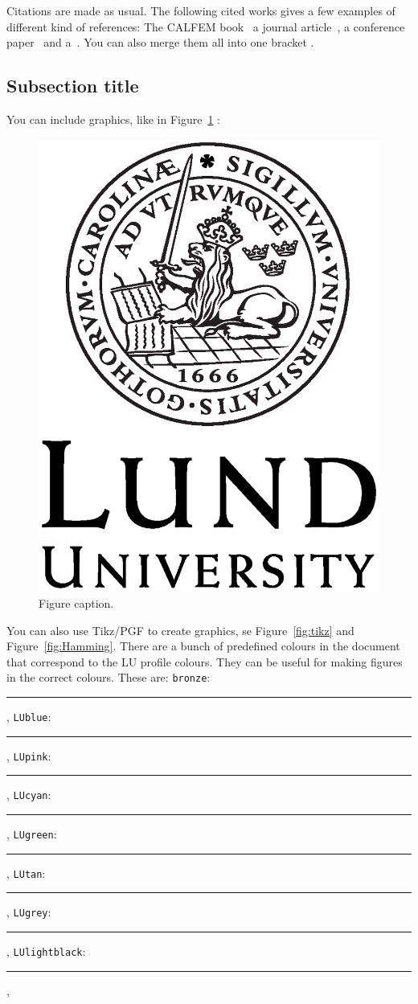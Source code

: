 Citations are made as usual. The following cited works gives a few examples of different kind of references: The CALFEM book~\cite{CALFEM} a journal article~\cite{JournalArticle}, a conference paper~\cite{Conference} and a~\cite{Thesis}. You can also merge them all into one bracket \cite{CALFEM,JournalArticle,Conference,Thesis}. 


\subsection{Subsection title}
You can include graphics, like in Figure~\ref{fig:logo} :
\begin{figure}
  \includegraphics[scale=0.3]{LundUniversity_C2line_BLACK.eps}
  \caption{Figure caption.}
  \label{fig:logo}
\end{figure}

You can also use Tikz/PGF to create graphics, se Figure~\ref{fig:tikz} and Figure~\ref{fig:Hamming}. There are a bunch of predefined colours in the document that correspond to the LU profile colours. They can be useful for making figures in the correct colours. These are: 
\texttt{bronze}:~{\color{bronze} \rule{20pt}{8pt}},
\texttt{LUblue}:~{\color{LUblue} \rule{20pt}{8pt}}, 
\texttt{LUpink}:~{\color{LUpink} \rule{20pt}{8pt}}, 
\texttt{LUcyan}:~{\color{LUcyan} \rule{20pt}{8pt}}, 
\texttt{LUgreen}:~{\color{LUgreen} \rule{20pt}{8pt}}, 
\texttt{LUtan}:~{\color{LUtan} \rule{20pt}{8pt}}, 
\texttt{LUgrey}:~{\color{LUgrey} \rule{20pt}{8pt}}, 
\texttt{LUlightblack}:~{\color{LUlightblack} \rule{20pt}{8pt}}, 


